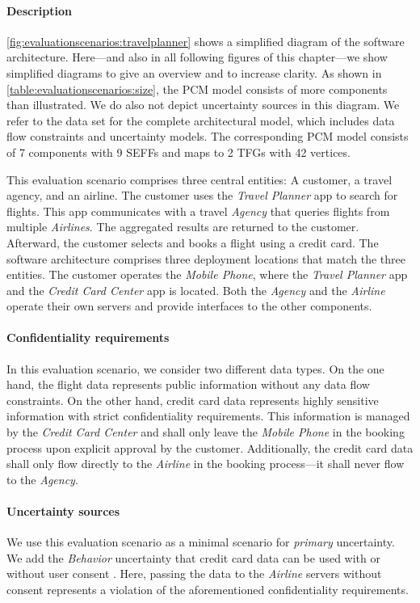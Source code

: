\paragraph{Description}
\autoref{fig:evaluationscenarios:travelplanner} shows a simplified diagram of the software architecture.
Here---and also in all following figures of this chapter---we show simplified diagrams to give an overview and to increase clarity.
As shown in \autoref{table:evaluationscenarios:size}, the \ac{PCM} model consists of more components than illustrated.
We do also not depict uncertainty sources in this diagram.
We refer to the data set \cite{dataset} for the complete architectural model, which includes data flow constraints and uncertainty models.
The corresponding \ac{PCM} model consists of 7 components with 9 \acp{SEFF} and maps to 2 \acp{TFG} with 42 vertices.

This evaluation scenario comprises three central entities: A customer, a travel agency, and an airline.
The customer uses the \emph{Travel Planner} app to search for flights.
This app communicates with a travel \emph{Agency} that queries flights from multiple \emph{Airlines}.
The aggregated results are returned to the customer.
Afterward, the customer selects and books a flight using a credit card.
The software architecture comprises three deployment locations that match the three entities.
The customer operates the \emph{Mobile Phone}, where the \emph{Travel Planner} app and the \emph{Credit Card Center} app is located.
Both the \emph{Agency} and the \emph{Airline} operate their own servers and provide interfaces to the other components.

\paragraph{Confidentiality requirements}
In this evaluation scenario, we consider two different data types.
On the one hand, the flight data represents public information without any data flow constraints.
On the other hand, credit card data represents highly sensitive information with strict confidentiality requirements.
This information is managed by the \emph{Credit Card Center} and shall only leave the \emph{Mobile Phone} in the booking process upon explicit approval by the customer.
Additionally, the credit card data shall only flow directly to the \emph{Airline} in the booking process---it shall never flow to the \emph{Agency}.

\paragraph{Uncertainty sources}
We use this evaluation scenario as a minimal scenario for \emph{primary} uncertainty.
We add the \emph{Behavior} uncertainty that credit card data can be used with or without user consent \cite{hahner_model-based_2023}.
Here, passing the data to the \emph{Airline} servers without consent represents a violation of the aforementioned confidentiality requirements.





